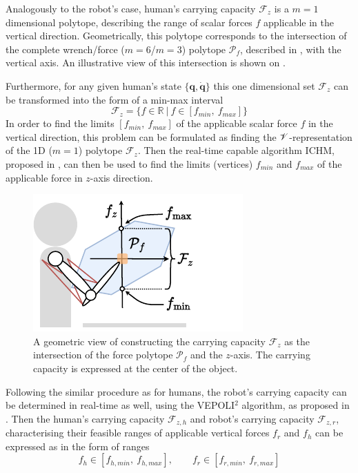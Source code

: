 Analogously to the robot's case, human's carrying capacity $\mathcal{F}_z$ is a $m=1$ dimensional polytope, describing the range of scalar forces $f$ applicable in the vertical direction. Geometrically, this polytope corresponds to the intersection of the complete wrench/force ($m=6$/$m=3$) polytope $\mathcal{P}_f$, described in , with the vertical axis. An illustrative view of this intersection is shown on .

Furthermore, for any given human's state $\{\bm{q},\dot{\bm{q}}\}$ this one dimensional set $\mathcal{F}_z$ can be transformed into the form of a min-max interval
\begin{equation}
    \mathcal{F}_z = \{ f \in \mathbb{R} ~|~ f \in[{f}_{min}, ~{f}_{max}]\}
\end{equation}
In order to find the limits $[f_{min},~f_{max}]$ of the applicable scalar force $f$ in the vertical direction, this problem can be formulated as finding the $\mathscr{V}$-representation of the 1D ($m=1$) polytope $\mathcal{F}_z$. Then the real-time capable algorithm ICHM, proposed in , can then be used to find the limits (vertices) $f_{min}$ and $f_{max}$ of the applicable force in $z$-axis direction.  


\begin{figure}
    \centering
    \includegraphics[width=\linewidth]{Papers/images/carrying_capacity_human.pdf}
    \caption{A geometric view of constructing the carrying capacity $\mathcal{F}_z$ as the intersection of the force polytope $\mathcal{P}_f$ and the $z$-axis. The carrying capacity is expressed at the center of the object.}
    \label{fig:carrying_cap_human}
\end{figure}
Following the similar procedure as for humans, the robot's carrying capacity can be determined in real-time as well, using the VEPOLI$^2$ algorithm, as proposed in . Then the human's carrying capacity $\mathcal{F}_{z,h}$ and robot's carrying capacity $\mathcal{F}_{z,r}$, characterising their feasible ranges of applicable vertical forces $f_r$ and $f_h$ can be expressed as in the form of ranges
\begin{equation}
    f_{h}\in [f_{h,min}, ~f_{h,max}], \qquad f_{r} \in [f_{r,min}, ~f_{r,max} ]
    \label{eq:human_robot_carrying_capacity}
\end{equation}

